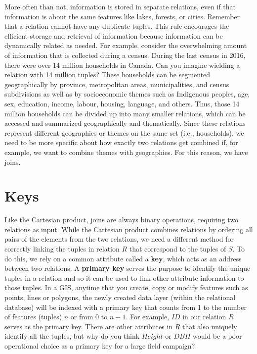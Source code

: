 \documentclass[
]{book}
\begin{document}
More often than not, information is stored in separate relations, even if that information is about the same features like lakes, forests, or cities. Remember that a relation cannot have any duplicate tuples. This rule encourages the efficient storage and retrieval of information because information can be dynamically related as needed. For example, consider the overwhelming amount of information that is collected during a census. During the last census in 2016, there were over 14 million households in Canada. Can you imagine wielding a relation with 14 million tuples? These households can be segmented geographically by province, metropolitan areas, municipalities, and census subdivisions as well as by socioeconomic themes such as Indigenous peoples, age, sex, education, income, labour, housing, language, and others. Thus, those 14 million households can be divided up into many smaller relations, which can be accessed and summarized geographically and thematically. Since these relations represent different geographies or themes on the same set (i.e., households), we need to be more specific about how exactly two relations get combined if, for example, we want to combine themes with geographies. For this reason, we have joins.

\hypertarget{keys}{%
\section{Keys}\label{keys}}

Like the Cartesian product, joins are always binary operations, requiring two relations as input. While the Cartesian product combines relations by ordering all pairs of the elements from the two relations, we need a different method for correctly linking the tuples in relation \(R\) that correspond to the tuples of \(S\). To do this, we rely on a common attribute called a \textbf{key}, which acts as an address between two relations. A \textbf{primary key} serves the purpose to identify the unique tuples in a relation and so it can be used to link other attribute information to those tuples. In a GIS, anytime that you create, copy or modify features such as points, lines or polygons, the newly created data layer (within the relational database) will be indexed with a primary key that counts from 1 to the number of features (tuples) \(n\) or from 0 to \(n-1\). For example, \(ID\) in our relation \(R\) serves as the primary key. There are other attributes in \(R\) that also uniquely identify all the tuples, but why do you think \(Height\) or \(DBH\) would be a poor operational choice as a primary key for a large field campaign?
\end{document}
